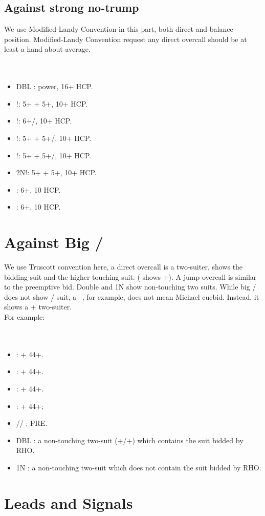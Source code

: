\documentclass[12pt,twoside,a5paper]{report}%
\begin{document}
	\section*{Against strong no-trump}
		We use Modified-Landy Convention in this part, both direct and balance position. Modified-Landy Convention request any direct overcall should be at least a hand about average.\\
		\\
		\\
		\begin{itemize}
		\renewcommand{\labelitemi}{--}
			\item DBL : power, 16+ HCP.
			\item {}!: 5+\sp{} + 5+\he{}, 10+ HCP.
			\item {}!: 6+\sp{}/\he{}, 10+ HCP.
			\item {}!: 5+\he{} + 5+\cl{}/\di{}, 10+ HCP.
			\item {}!: 5+\sp{} + 5+\cl{}/\di{}, 10+ HCP.
			\item 2N!: 5+\cl{} + 5+\di{}, 10+ HCP.
			\item {} : 6+\cl{}, 10 HCP.
			\item {} : 6+\di{}, 10 HCP.
		\end{itemize}
\chapter*{Against Big \cl{}/\di{}}
	We use Truscott convention here, a direct overcall is a two-suiter, shows the bidding suit and the higher touching suit. ( shows \sp{}+\cl{}). A jump overcall is similar to the preemptive bid. Double and 1N show non-touching two suits. While big \cl{}/\di{} does not show \cl{}/\di{} suit, a --, for example, does not mean Michael cuebid. Instead, it shows a \cl{}+\di{} two-suiter.\\
	For example:\\
	\\
	\\
	\begin{itemize}
	\renewcommand{\labelitemi}{--}
		\item {} : \di{}+\he{} 44+.
		\item {} : \he{}+\sp{} 44+.
		\item {} : \sp{}+\cl{} 44+.
		\item {} : \cl{}+\di{} 44+;
		\item {}/\he{}/\sp{} : PRE.
		\item DBL : a non-touching two-suit (\he{}+\cl{}/\sp{}+\di{}) which contains the suit bidded by RHO.
		\item 1N : a non-touching two-suit which does not contain the suit bidded by RHO.
	\end{itemize}
\chapter*{Leads and Signals}
\end{document}
